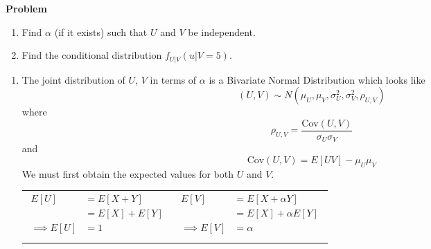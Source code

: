 \documentclass[12pt]{article}
\newenvironment{Ex}{\textbf{Problem}\vspace{.75em}\\}{}
\begin{document}
\begin{enumerate}
\begin{Ex}
\begin{enumerate}
    \item Find $\alpha$ (if it exists) such that $U$ and $V$ be
      independent.
    \item Find the conditional distribution $f_{U|V}(u|V = 5)$.
    \end{enumerate}
    \begin{solution} \hfill
      \begin{enumerate}
      \item The joint distribution of $U$, $V$ in terms of $\alpha$ is
        a Bivariate Normal Distribution which looks like
        \begin{equation}
          \label{eq:5a-biv-decl}
          (U,V) \sim N(\mu_U, \mu_V, \sigma_U^2, \sigma_V^2, \rho_{U,V})
        \end{equation}
        where
        \begin{equation}
          \label{eq:5a-rho-decl}
          \rho_{U,V} = \frac{\text{Cov}(U,V)}{\sigma_U \sigma_V}
        \end{equation}
        and
        \begin{equation}
          \label{eq:5a-cov-decl}
          \text{Cov}(U,V) = E[UV]-\mu_U \mu_V
        \end{equation}
        We must first obtain the expected values for both $U$ and
        $V$. \\
        \begin{tabularx}{.95\textwidth}{XX}
          \begin{equation}
            \label{eq:5a-e-u}
            \begin{aligned}
              E[U] &= E[X+Y] \\
              &= E[X] + E[Y] \\
              \implies E[U] &= 1 \\
            \end{aligned}
          \end{equation} &
          \begin{equation}
            \label{eq:5a-e-v}
            \begin{aligned}
              E[V] &= E[X + \alpha Y] \\
              &= E[X] + \alpha E[Y] \\
              \implies E[V] &= \alpha \\
            \end{aligned}
          \end{equation}
        \end{tabularx}

\end{enumerate}
\end{solution}
\end{Ex}
\end{enumerate}
\end{document}
